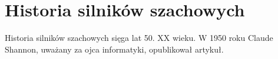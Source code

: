 \section{Historia silników szachowych}
\label{sec:historia-silnikow-szachowych}

Historia silników szachowych sięga lat 50. XX wieku. W 1950 roku Claude Shannon, uważany za ojca informatyki, opublikował artykuł.